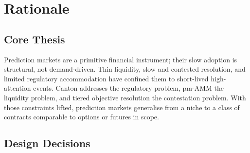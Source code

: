 \documentclass[11pt,a4paper]{article}
\begin{document}
\section{Rationale}

\subsection{Core Thesis}

Prediction markets are a primitive financial instrument; their slow adoption is structural, not demand-driven. Thin liquidity, slow and contested resolution, and limited regulatory accommodation have confined them to short-lived high-attention events. Canton addresses the regulatory problem, pm-AMM the liquidity problem, and tiered objective resolution the contestation problem. With those constraints lifted, prediction markets generalise from a niche to a class of contracts comparable to options or futures in scope.

\subsection{Design Decisions}
\label{sec:design}
\end{document}
